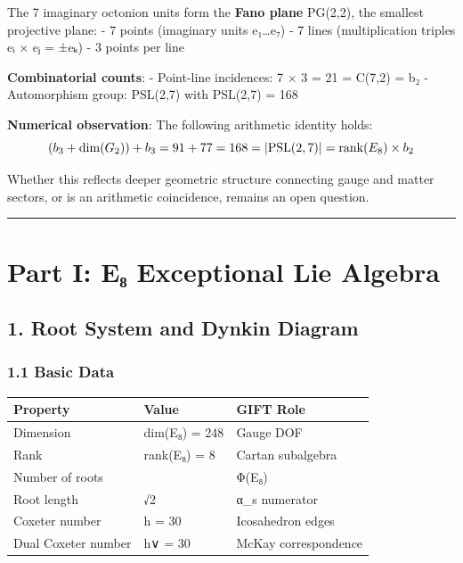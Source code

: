 \documentclass[11pt,a4paper]{article}
\begin{document}
{{The 7 imaginary octonion units form the \textbf{Fano plane} PG(2,2), the smallest projective plane:
- 7 points (imaginary units e₁\ldots e₇)
- 7 lines (multiplication triples eᵢ × eⱼ = ±eₖ)
- 3 points per line

\textbf{Combinatorial counts}:
- Point-line incidences: 7 × 3 = 21 = C(7,2) = b₂
- Automorphism group: PSL(2,7) with \textbar PSL(2,7)\textbar{} = 168

\textbf{Numerical observation}: The following arithmetic identity holds:
\[(b_3 + \dim(G_2)) + b_3 = 91 + 77 = 168 = |{\rm PSL}(2,7)| = {\rm rank}(E_8) \times b_2\]

Whether this reflects deeper geometric structure connecting gauge and matter sectors, or is an arithmetic coincidence, remains an open question.

\begin{center}\rule{0.5\linewidth}{0.5pt}\end{center}

\section{Part I: E₈ Exceptional Lie Algebra}\label{part-i-eux2088-exceptional-lie-algebra}

\subsection{1. Root System and Dynkin Diagram}\label{root-system-and-dynkin-diagram}

\subsubsection{1.1 Basic Data}\label{basic-data}

{\def\LTcaptype{none} %
\begin{longtable}[]{@{}lll@{}}
\toprule\noalign{}
Property & Value & GIFT Role \\
\midrule\noalign{}
\endhead
\bottomrule\noalign{}
\endlastfoot
Dimension & dim(E₈) = 248 & Gauge DOF \\
Rank & rank(E₈) = 8 & Cartan subalgebra \\
Number of roots & & Φ(E₈) \\
Root length & √2 & α\_s numerator \\
Coxeter number & h = 30 & Icosahedron edges \\
Dual Coxeter number & h∨ = 30 & McKay correspondence \\
\end{longtable}
}}}
\end{document}
